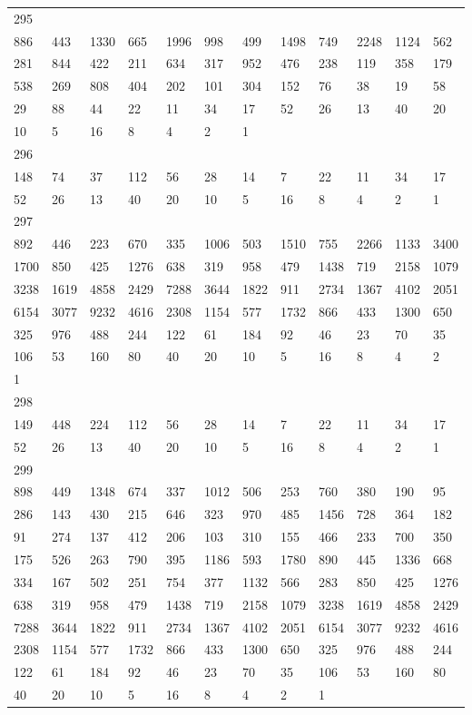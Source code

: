 \begin{longtable}{llllllllllll}
295&&&&&&&&&&&\\
886& 443& 1330& 665& 1996& 998& 499& 1498& 749& 2248& 1124& 562\\
281& 844& 422& 211& 634& 317& 952& 476& 238& 119& 358& 179\\
538& 269& 808& 404& 202& 101& 304& 152& 76& 38& 19& 58\\
29& 88& 44& 22& 11& 34& 17& 52& 26& 13& 40& 20\\
10& 5& 16& 8& 4& 2& 1& \\

296&&&&&&&&&&&\\
148& 74& 37& 112& 56& 28& 14& 7& 22& 11& 34& 17\\
52& 26& 13& 40& 20& 10& 5& 16& 8& 4& 2& 1\\

297&&&&&&&&&&&\\
892& 446& 223& 670& 335& 1006& 503& 1510& 755& 2266& 1133& 3400\\
1700& 850& 425& 1276& 638& 319& 958& 479& 1438& 719& 2158& 1079\\
3238& 1619& 4858& 2429& 7288& 3644& 1822& 911& 2734& 1367& 4102& 2051\\
6154& 3077& 9232& 4616& 2308& 1154& 577& 1732& 866& 433& 1300& 650\\
325& 976& 488& 244& 122& 61& 184& 92& 46& 23& 70& 35\\
106& 53& 160& 80& 40& 20& 10& 5& 16& 8& 4& 2\\
1& \\

298&&&&&&&&&&&\\
149& 448& 224& 112& 56& 28& 14& 7& 22& 11& 34& 17\\
52& 26& 13& 40& 20& 10& 5& 16& 8& 4& 2& 1\\

299&&&&&&&&&&&\\
898& 449& 1348& 674& 337& 1012& 506& 253& 760& 380& 190& 95\\
286& 143& 430& 215& 646& 323& 970& 485& 1456& 728& 364& 182\\
91& 274& 137& 412& 206& 103& 310& 155& 466& 233& 700& 350\\
175& 526& 263& 790& 395& 1186& 593& 1780& 890& 445& 1336& 668\\
334& 167& 502& 251& 754& 377& 1132& 566& 283& 850& 425& 1276\\
638& 319& 958& 479& 1438& 719& 2158& 1079& 3238& 1619& 4858& 2429\\
7288& 3644& 1822& 911& 2734& 1367& 4102& 2051& 6154& 3077& 9232& 4616\\
2308& 1154& 577& 1732& 866& 433& 1300& 650& 325& 976& 488& 244\\
122& 61& 184& 92& 46& 23& 70& 35& 106& 53& 160& 80\\
40& 20& 10& 5& 16& 8& 4& 2& 1& \\


\end{longtable}
